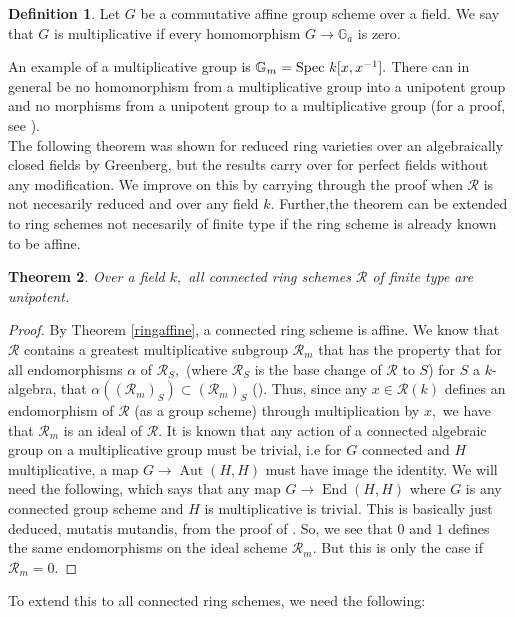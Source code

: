\documentclass[a4paper, 12pt]{amsart}
\DeclareMathOperator{\End}{End}
\DeclareMathOperator{\Aut}{Aut}
\numberwithin{equation}{section}
\newtheorem{theorem}{Theorem}[section]
\theoremstyle{definition}
\newtheorem{definition}[theorem]{Definition}
\begin{document}
\begin{definition}
Let $G$ be a commutative affine group scheme over a field. We say that $G$ is multiplicative if every homomorphism $G \rightarrow \mathbb{G}_a$ is zero.
\end{definition}
\noindent An example of a multiplicative group is $\mathbb{G}_m = \text{Spec } k[x,x^{-1}].$ There can in general be no homomorphism from a multiplicative group into a unipotent group and no morphisms from a unipotent group to a multiplicative group (for a proof, see \cite[Corollary 15.19-15.20]{MilneiAG}).\\ 
\noindent The following theorem was shown for reduced ring varieties over an algebraically closed fields by
Greenberg, but the results carry over for perfect fields without any modification. We improve on this by carrying through the proof when $\mathcal{R}$  is not necesarily reduced and over any field $k$. Further,the theorem can be extended to ring schemes not necesarily of finite type if
the ring scheme is already known to be affine. 
\begin{theorem} \label{ringunipotent}
Over a field $k,$ all connected ring schemes $\mathcal{R}$ of
finite type are unipotent.
\end{theorem}
\begin{proof}
By Theorem \ref{ringaffine}, a connected ring scheme is affine. We know that $\mathcal{R}$ contains a greatest multiplicative subgroup $\mathcal{R}_m$ that has the property that for all endomorphisms $\alpha$ of $\mathcal{R}_S,$ (where $\mathcal{R}_S$ is the base change of $\mathcal{R}$ to $S$) for $S$ a $k$-algebra, that $\alpha((\mathcal{R}_m)_S) \subset (\mathcal{R}_m)_S$ (\cite[Theorem 17.16]{MilneiAG}). Thus, since any $x \in \mathcal{R}(k)$ defines an endomorphism of $\mathcal{R}$ (as a group scheme) through multiplication by $x,$ we have that $\mathcal{R}_m$ is an ideal of $\mathcal{R}.$ It is known that any action of a connected algebraic group on a multiplicative group must be trivial, i.e for $G$ connected and $H$ multiplicative, a map $G \rightarrow \Aut(H,H)$ must have image the identity. We will need the following, which says that any map $G \rightarrow \End(H,H)$ where $G$ is any connected group scheme and $H$ is multiplicative is trivial. This is basically just deduced, mutatis mutandis, from the proof of \cite[Theorem 14.28]{MilneiAG}.  So, we see that $0$ and $1$ defines the same endomorphisms on the ideal scheme $\mathcal{R}_m.$ But this is only the case if $\mathcal{R}_m=0.$  \end{proof}
\noindent To extend this to all connected ring schemes, we need the following:
\end{document}
